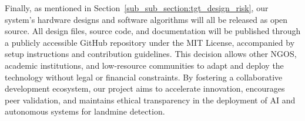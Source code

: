 Finally, as mentioned in Section~\ref{sub_sub_section:tgt_design_risk}, our system’s hardware designs and software algorithms will all be released as open source. All design files, source code, and documentation will be published through a publicly accessible GitHub repository under the MIT License, accompanied by setup instructions and contribution guidelines. This decision allows other \gls{NGOS}, academic institutions, and low-resource communities to adapt and deploy the technology without legal or financial constraints. By fostering a collaborative development ecosystem, our project aims to accelerate innovation, encourages peer validation, and maintains ethical transparency in the deployment of AI and autonomous systems for landmine detection.
